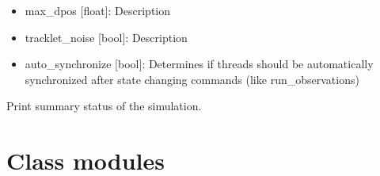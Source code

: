 \documentclass[letterpaper,10pt,english]{sphinxmanual}
\begin{document}
\begin{fulllineitems}
\begin{fulllineitems}
\begin{quote}
\begin{description}
\end{description}\end{quote}

\begin{itemize}
\item {} 
max\_dpos {[}float{]}: Description

\item {} 
tracklet\_noise {[}bool{]}: Description

\item {} 
auto\_synchronize {[}bool{]}: Determines if threads should be automatically synchronized after state changing commands (like run\_observations)

\end{itemize}

\end{fulllineitems}


\begin{fulllineitems}
\label{\detokenize{modules/simulation:simulation.Simulation.status}}
Print summary status of the simulation.

\end{fulllineitems}


\end{fulllineitems}



\section{Class modules}
\label{\detokenize{modules/doc:class-modules}}
\end{document}
